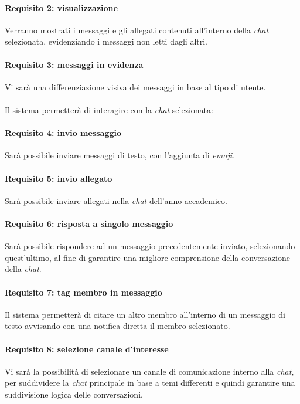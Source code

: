 \begin{enumerate}
\paragraph{Requisito 2: visualizzazione\\}
Verranno mostrati i messaggi e gli allegati contenuti all’interno della \emph{chat} selezionata, evidenziando i messaggi non letti dagli altri.

\paragraph{Requisito 3: messaggi in evidenza\\}
Vi sarà una differenziazione visiva dei messaggi in base al tipo di utente.\\
\\
Il sistema permetterà di interagire con la \emph{chat} selezionata:

\paragraph{Requisito 4: invio messaggio\\}
Sarà possibile inviare messaggi di testo, con l’aggiunta di \emph{emoji}.

\paragraph{Requisito 5: invio allegato\\}
Sarà possibile inviare allegati nella \emph{chat} dell’anno accademico.

\paragraph{Requisito 6: risposta a singolo messaggio\\}
Sarà possibile rispondere ad un messaggio precedentemente inviato, selezionando quest’ultimo, al fine di garantire una migliore comprensione della conversazione della \emph{chat}.

\paragraph{Requisito 7: tag membro in messaggio\\}
Il sistema permetterà di citare un altro membro all’interno di un messaggio di testo avvisando con una notifica diretta il membro selezionato.

\paragraph{Requisito 8: selezione canale d'interesse\\}
Vi sarà la possibilità di selezionare un canale di comunicazione interno alla \emph{chat}, per suddividere la \emph{chat} principale in base a temi differenti e quindi garantire una suddivisione logica delle conversazioni.


\end{enumerate}
